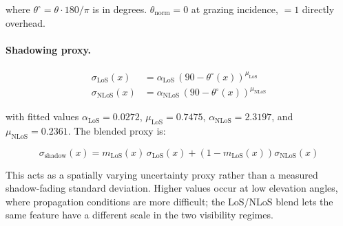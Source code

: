 where $\theta^\circ = \theta \cdot 180/\pi$ is in degrees. $\theta_{\mathrm{norm}}
= 0$ at grazing incidence, $= 1$ directly overhead.

\paragraph{Shadowing proxy.}

\begin{align}
\sigma_{\mathrm{LoS}}(x) &= \alpha_{\mathrm{LoS}}\,(90-\theta^\circ(x))^{\mu_{\mathrm{LoS}}}
\label{eq:sigma_los_v2}\\
\sigma_{\mathrm{NLoS}}(x) &= \alpha_{\mathrm{NLoS}}\,(90-\theta^\circ(x))^{\mu_{\mathrm{NLoS}}}
\label{eq:sigma_nlos_v2}
\end{align}

with fitted values $\alpha_{\mathrm{LoS}} = 0.0272$, $\mu_{\mathrm{LoS}}
= 0.7475$, $\alpha_{\mathrm{NLoS}} = 2.3197$, and
$\mu_{\mathrm{NLoS}} = 0.2361$. The blended proxy is:

\begin{equation}
\sigma_{\mathrm{shadow}}(x)=
m_{\mathrm{LoS}}(x)\,\sigma_{\mathrm{LoS}}(x)
+\left(1-m_{\mathrm{LoS}}(x)\right)\sigma_{\mathrm{NLoS}}(x)
\label{eq:sigma_blend}
\end{equation}

This acts as a spatially varying uncertainty proxy rather than a measured
shadow-fading standard deviation. Higher values occur at low elevation angles,
where propagation conditions are more difficult; the LoS/NLoS blend lets the
same feature have a different scale in the two visibility regimes.

